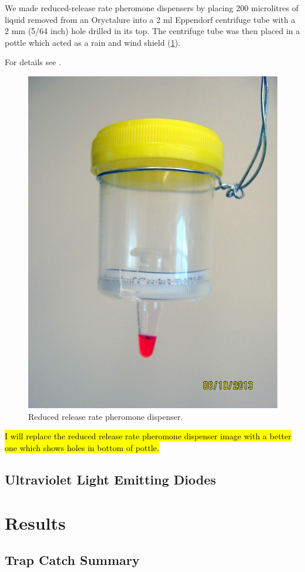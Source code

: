 \documentclass[12pt,letterpaper,english,bibliography=totocnumbered, abstract=on]{scrartcl}
\begin{document}
We made reduced-release
rate pheromone dispensers by placing 200 microlitres of liquid removed from an Oryctalure into a 2 ml Eppendorf
centrifuge tube with a 2 mm (5/64 inch) hole drilled in its top. The centrifuge tube was then placed
in a pottle which acted as a rain and wind shield (\ref{fig:reduced-release-rate-device}).

For details see \cite{moore_technical_2013}.

\begin{figure}[h]
	\centering
	\includegraphics[width=0.5\linewidth]{images/reduced-release-rate-device}
	\caption{Reduced release rate pheromone dispenser.}
	\label{fig:reduced-release-rate-device}
\end{figure}

\hl{I will replace the reduced release rate pheromone dispenser image with a better one which shows holes in bottom of pottle.}

\subsection{Ultraviolet Light Emitting Diodes}

\cite{moore_solar_2013}

\cite{moore_relative_2014}

\clearpage

\section{Results}

\subsection{Trap Catch Summary}
\end{document}
